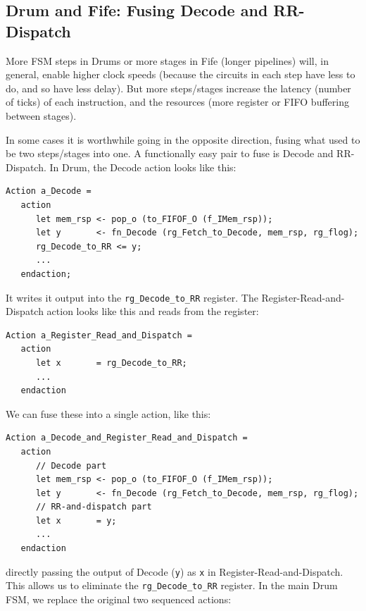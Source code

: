 
\subsection{Drum and Fife: Fusing Decode and RR-Dispatch}

\label{Sec_Fuse_Decode_RR}

More FSM steps in Drums or more stages in Fife (longer pipelines)
will, in general, enable higher clock speeds (because the circuits in
each step have less to do, and so have less delay).  But more
steps/stages increase the latency (number of ticks) of each
instruction, and the resources (more register or FIFO buffering
between stages).

In some cases it is worthwhile going in the opposite direction, fusing
what used to be two steps/stages into one.  A functionally easy pair
to fuse is Decode and RR-Dispatch.  In Drum, the Decode action looks
like this:

{\small
\begin{Verbatim}[frame=single, label=src\_Drum/CPU.bsv]
   Action a_Decode =
   action
      let mem_rsp <- pop_o (to_FIFOF_O (f_IMem_rsp));
      let y       <- fn_Decode (rg_Fetch_to_Decode, mem_rsp, rg_flog);
      rg_Decode_to_RR <= y;
      ...
   endaction;
\end{Verbatim}
}

It writes it output into the \verb|rg_Decode_to_RR| register.  The
Register-Read-and-Dispatch action looks like this and reads from the
register:

{\small
\begin{Verbatim}[frame=single, label=src\_Drum/CPU.bsv]
   Action a_Register_Read_and_Dispatch =
   action
      let x       = rg_Decode_to_RR;
      ...
   endaction
\end{Verbatim}
}

We can fuse these into a single action, like this:

{\small
\begin{Verbatim}[frame=single]
   Action a_Decode_and_Register_Read_and_Dispatch =
   action
      // Decode part
      let mem_rsp <- pop_o (to_FIFOF_O (f_IMem_rsp));
      let y       <- fn_Decode (rg_Fetch_to_Decode, mem_rsp, rg_flog);
      // RR-and-dispatch part
      let x       = y;
      ...
   endaction
\end{Verbatim}
}

directly passing the output of Decode (\verb|y|) as \verb|x| in
Register-Read-and-Dispatch.  This allows us to eliminate the
\verb|rg_Decode_to_RR| register.  In the main Drum FSM, we replace the
original two sequenced actions:

